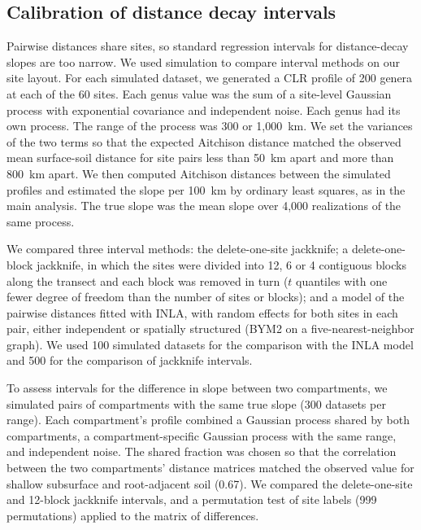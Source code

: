 \documentclass[11pt]{article}
\begin{document}
\subsection{Calibration of distance decay intervals}\label{decay_calibration}
Pairwise distances share sites, so standard regression intervals for distance-decay slopes are too narrow. We used simulation to compare interval methods on our site layout. For each simulated dataset, we generated a CLR profile of 200 genera at each of the 60 sites. Each genus value was the sum of a site-level Gaussian process with exponential covariance and independent noise. Each genus had its own process. The range of the process was 300 or 1,000~km. We set the variances of the two terms so that the expected Aitchison distance matched the observed mean surface-soil distance for site pairs less than 50~km apart and more than 800~km apart. We then computed Aitchison distances between the simulated profiles and estimated the slope per 100~km by ordinary least squares, as in the main analysis. The true slope was the mean slope over 4,000 realizations of the same process.

We compared three interval methods: the delete-one-site jackknife; a delete-one-block jackknife, in which the sites were divided into 12, 6 or 4 contiguous blocks along the transect and each block was removed in turn ($t$ quantiles with one fewer degree of freedom than the number of sites or blocks); and a model of the pairwise distances fitted with INLA, with random effects for both sites in each pair, either independent or spatially structured (BYM2 on a five-nearest-neighbor graph). We used 100 simulated datasets for the comparison with the INLA model and 500 for the comparison of jackknife intervals.

To assess intervals for the difference in slope between two compartments, we simulated pairs of compartments with the same true slope (300 datasets per range). Each compartment's profile combined a Gaussian process shared by both compartments, a compartment-specific Gaussian process with the same range, and independent noise. The shared fraction was chosen so that the correlation between the two compartments' distance matrices matched the observed value for shallow subsurface and root-adjacent soil (0.67). We compared the delete-one-site and 12-block jackknife intervals, and a permutation test of site labels (999 permutations) applied to the matrix of differences.
\end{document}
